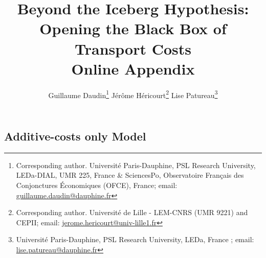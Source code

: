 \documentclass[11pt,twoside, authoryear]{elsarticle}
\begin{document}
\title{\textbf{Beyond the Iceberg Hypothesis: \\Opening the Black Box of Transport Costs}\\Online Appendix}

\author{Guillaume Daudin\footnote{\noindent Corresponding author. Universit\'{e} Paris-Dauphine, PSL Research University, LEDa-DIAL, UMR 225, France \&
SciencesPo, Observatoire Français des Conjonctures \'{E}conomiques (OFCE), France; email: \url{guillaume.daudin@dauphine.fr}} \qquad \quad Jérôme Héricourt\footnote{\noindent Corresponding author. Université de Lille - LEM-CNRS (UMR 9221) and CEPII; email: \url{jerome.hericourt@univ-lille1.fr}} \qquad \quad Lise Patureau\footnote{\noindent Universit\'{e} Paris-Dauphine, PSL Research University, LEDa, France ; email: \url{lise.patureau@dauphine.fr}}}



\maketitle






\tableofcontents
\vspace{1cm}
\newpage
\listoftables

\newpage



%
%
%
%
%			
%			
%				
%
%

	\renewcommand\thesubsubsection{\Alph{subsection}.\arabic{subsubsection}}
	
	\renewcommand\thesubsection{\Alph{subsection}}
	
	
\subsection{Additive-costs only Model \label{secoa:additive_only}}

\setcounter{table}{0}
\renewcommand{\thetable}{A.\arabic{table}}
\end{document}
